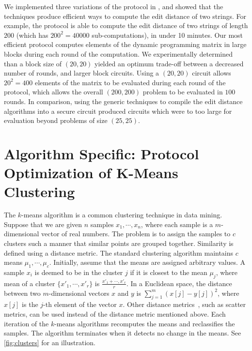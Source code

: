 We implemented three variations of the protocol in \cite{kruger07},
and showed that the techniques produce efficient ways to compute the
edit distance of two strings. For example, the protocol is able to
compute the edit distance of two strings of length $200$ (which has
$200^{2}=40000$ sub-computations), in under 10 minutes. Our most
efficient protocol computes elements of the dynamic programming matrix
in large blocks during each round of the computation. We experimentally
determined than a block size of $(20,20)$ yielded an optimum trade-off
between a decreased number of rounds, and larger block circuits. Using
a $(20,20)$ circuit allows $20^{2}=400$ elements of the matrix to
be evaluated during each round of the protocol, which allows the overall
$(200,200)$ problem to be evaluated in $100$ rounds. In comparison,
using the generic techniques to compile the edit distance algorithms
into a secure circuit produced circuits which were to too large for
evaluation beyond problems of size $(25,25)$.


\section{Algorithm Specific: Protocol Optimization of K-Means Clustering}

The $k$-means algorithm is a common clustering technique in data
mining. Suppose that we are given $n$ samples $x_{1},\cdots,x_{n}$,
where each sample is a $m$-dimensional vector of real numbers. The
problem is to assign the samples to $c$ clusters such a manner that
similar points are grouped together. Similarity is defined using a
distance metric. The standard clustering algorithm maintains $c$
means $\mu_{1},\cdots,\mu_{c}$. Initially, assume that the means
are assigned arbitrary values. A sample $x_{i}$ is deemed to be in
the cluster $j$ if it is closest to the mean $\mu_{j}$, where mean
of a cluster $\{x'_{1},\cdots,x'_{r}\}$ is $\frac{x'_{1}+\cdots,x'_{r}}{r}$.
In a Euclidean space, the distance between two $m$-dimensional vectors
$x$ and $y$ is $\sum_{j=1}^{m}(x[j]-y[j])^{2}$, where $x[j]$ is
the $j$-th element of the vector $x$. Other distance metrics~\cite[Chapter 10]{pattern-classification},
such as scatter metrics, can be used instead of the distance metric
mentioned above. Each iteration of the $k$-means algorithms recomputes
the means and reclassifies the samples. The algorithm terminates when
it detects no change in the means. See \ref{fig:clusters} for an
illustration.

